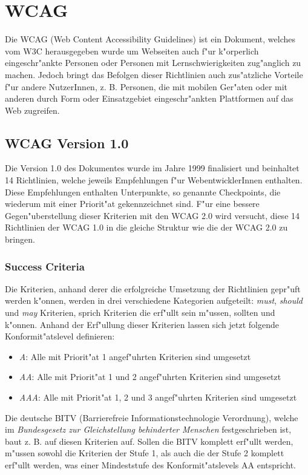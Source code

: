 \documentclass[a4paper,bibtotoc,oneside]{scrbook}
\begin{document}
\chapter{WCAG}
Die WCAG (Web Content Accessibility Guidelines) ist ein Dokument, welches vom W3C herausgegeben wurde um Webseiten auch f"ur k"orperlich eingeschr"ankte Personen oder Personen mit Lernschwierigkeiten zug"anglich zu machen. Jedoch bringt das Befolgen dieser Richtlinien auch zus"atzliche Vorteile f"ur andere NutzerInnen, z. B. Personen, die mit mobilen Ger"aten oder mit anderen durch Form oder Einsatzgebiet eingeschr"ankten Plattformen auf das Web zugreifen. \cite[Abschnitt Abstract]{wcag1}


\section{WCAG Version 1.0}
Die Version 1.0 des Dokumentes wurde im Jahre 1999 finalisiert und beinhaltet 14 Richtlinien, welche jeweils Empfehlungen f"ur WebentwicklerInnen enthalten. Diese Empfehlungen enthalten Unterpunkte, so genannte Checkpoints, die wiederum mit einer Priorit"at gekennzeichnet sind. \cite[Abschnitt Abstract]{wcag1}
F"ur eine bessere Gegen"uberstellung dieser Kriterien mit den WCAG 2.0 wird versucht, diese 14 Richtlinien der WCAG 1.0 in die gleiche Struktur wie die der WCAG 2.0 zu bringen.

\subsection{Success Criteria}
Die Kriterien, anhand derer die erfolgreiche Umsetzung der Richtlinien gepr"uft werden k"onnen, werden in drei verschiedene Kategorien aufgeteilt: \emph{must}, \emph{should} und \emph{may} Kriterien, sprich Kriterien die erf"ullt sein m"ussen, sollten und k"onnen. Anhand der Erf"ullung dieser Kriterien lassen sich jetzt folgende Konformit"atslevel definieren: \cite[Abschnitt 4]{wcag1}

\begin{itemize}
\item \emph{A}: Alle mit Priorit"at 1 angef"uhrten Kriterien sind umgesetzt
\item \emph{AA}: Alle mit Priorit"at 1 und 2 angef"uhrten Kriterien sind umgesetzt
\item \emph{AAA}: Alle mit Priorit"at 1, 2 und 3 angef"uhrten Kriterien sind umgesetzt
\end{itemize}

Die deutsche BITV (Barrierefreie Informationstechnologie Verordnung), welche im \emph{Bundesgesetz zur Gleichstellung behinderter Menschen} festgeschrieben ist, baut z. B. auf diesen Kriterien auf. Sollen die BITV komplett erf"ullt werden, m"ussen sowohl die Kriterien der Stufe 1, als auch die der Stufe 2 komplett erf"ullt werden, was einer Mindeststufe des Konformit"atslevels AA entspricht. \cite[S. 38-39]{barr_webd}
\end{document}
